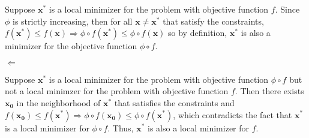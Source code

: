 \documentclass[letterpaper,12pt]{article}
\theoremstyle{definition}
\begin{document}
\begin{enumerate}
      Suppose $\mathbf{x^*}$ is a local minimizer for the problem with objective function $f$. Since $\phi$ is strictly increasing, then for all $\mathbf{x}\neq\mathbf{x^*}$ that satisfy the constraints, $f(\mathbf{x^*})\leq f(\mathbf{x}) \Longrightarrow \phi\circ f(\mathbf{x^*})\leq \phi\circ f(\mathbf{x})$ so by definition, $\mathbf{x^*}$ is also a minimizer for the objective function $\phi\circ f$.
      
    $\Longleftarrow$

      Suppose $\mathbf{x^*}$ is a local minimizer for the problem with objective function $\phi\circ f$ but not a local minimzer for the problem with objective function $f$. Then there exists $\mathbf{x_0}$ in the neighborhood of $\mathbf{x^*}$ that satisfies the constraints and $f(\mathbf{x_0}) \leq f(\mathbf{x^*}) \Longrightarrow \phi\circ f(\mathbf{x_0})\leq \phi\circ f(\mathbf{x^*})$, which contradicts the fact that $\mathbf{x^*}$ is a local minimizer for $\phi\circ f$. Thus, $\mathbf{x^*}$ is also a local minimizer for $f$.
\end{enumerate}
\end{document}
